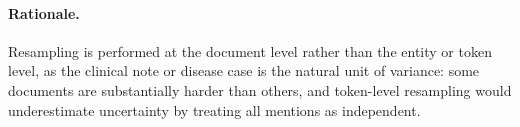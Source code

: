 \paragraph{Rationale.}
Resampling is performed at the document level rather than the entity or token
level, as the clinical note or disease case is the natural unit of variance:
some documents are substantially harder than others, and token-level
resampling would underestimate uncertainty by treating all mentions as
independent.